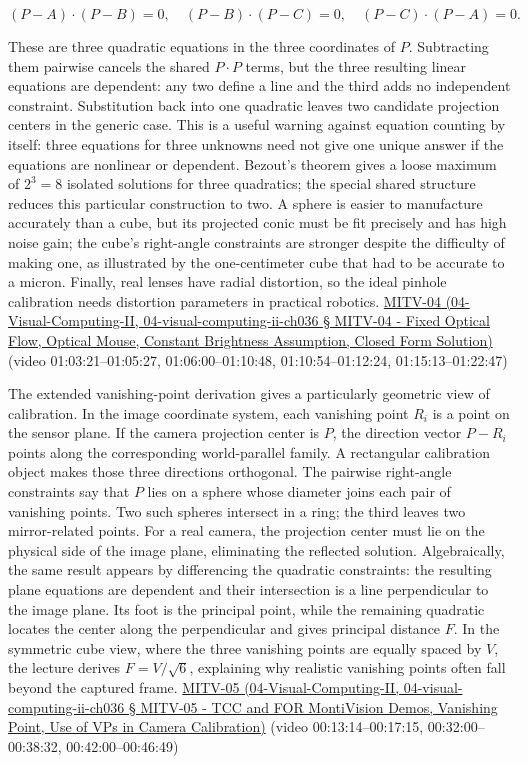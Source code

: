 \[
(P-A)\cdot(P-B)=0,\quad (P-B)\cdot(P-C)=0,\quad (P-C)\cdot(P-A)=0.
\]

These are three quadratic equations in the three coordinates of \(P\). Subtracting them pairwise cancels the shared \(P\cdot P\) terms, but the three resulting linear equations are dependent: any two define a line and the third adds no independent constraint. Substitution back into one quadratic leaves two candidate projection centers in the generic case. This is a useful warning against equation counting by itself: three equations for three unknowns need not give one unique answer if the equations are nonlinear or dependent. Bezout's theorem gives a loose maximum of \(2^3=8\) isolated solutions for three quadratics; the special shared structure reduces this particular construction to two. A sphere is easier to manufacture accurately than a cube, but its projected conic must be fit precisely and has high noise gain; the cube's right-angle constraints are stronger despite the difficulty of making one, as illustrated by the one-centimeter cube that had to be accurate to a micron. Finally, real lenses have radial distortion, so the ideal pinhole calibration needs distortion parameters in practical robotics. \href{}{MITV-04 (04-Visual-Computing-II, 04-visual-computing-ii-ch036 § MITV-04 - Fixed Optical Flow, Optical Mouse, Constant Brightness Assumption, Closed Form Solution)} (video 01:03:21--01:05:27, 01:06:00--01:10:48, 01:10:54--01:12:24, 01:15:13--01:22:47)

The extended vanishing-point derivation gives a particularly geometric view of calibration. In the image coordinate system, each vanishing point \(R_i\) is a point on the sensor plane. If the camera projection center is \(P\), the direction vector \(P-R_i\) points along the corresponding world-parallel family. A rectangular calibration object makes those three directions orthogonal. The pairwise right-angle constraints say that \(P\) lies on a sphere whose diameter joins each pair of vanishing points. Two such spheres intersect in a ring; the third leaves two mirror-related points. For a real camera, the projection center must lie on the physical side of the image plane, eliminating the reflected solution. Algebraically, the same result appears by differencing the quadratic constraints: the resulting plane equations are dependent and their intersection is a line perpendicular to the image plane. Its foot is the principal point, while the remaining quadratic locates the center along the perpendicular and gives principal distance \(F\). In the symmetric cube view, where the three vanishing points are equally spaced by \(V\), the lecture derives \(F=V/\sqrt{6}\), explaining why realistic vanishing points often fall beyond the captured frame. \href{}{MITV-05 (04-Visual-Computing-II, 04-visual-computing-ii-ch036 § MITV-05 - TCC and FOR MontiVision Demos, Vanishing Point, Use of VPs in Camera Calibration)} (video 00:13:14--00:17:15, 00:32:00--00:38:32, 00:42:00--00:46:49)

